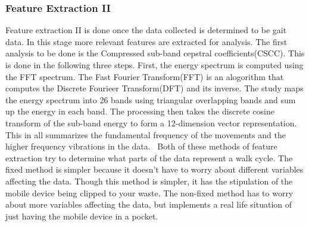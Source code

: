 \documentclass{sig-alternate}
\begin{document}
\subsubsection{Feature Extraction II}{
	Feature extraction II is done once the data collected is determined to be gait data. In this stage more relevant features are extracted for analysis. The first analysis to be done is the Compressed sub-band cepstral coefficients(CSCC). This is done in the following three steps. First, the energy spectrum is computed using the FFT spectrum. The Fast Fourier Transform(FFT) is an alogorithm that computes the Discrete Fourieer Transform(DFT) and its inverse. The study maps the energy spectrum into 26 bands using triangular overlapping bands and sum up the energy in each band. The processing then takes the discrete cosine transform of the sub-band energy to form a 12-dimension vector representation. This in all summarizes the fundamental frequency of the movements and the higher frequency vibrations in the data.~\cite{Sujithra:2012}
}
	Both of these methods of feature extraction try to determine what parts of the data represent a walk cycle. The fixed method is simpler because it doesn't have to worry about different variables affecting the data. Though this method is simpler, it has the stipulation of the mobile device being clipped to your waste. The non-fixed method has to worry about more variables affecting the data, but implements a real life situation of just having the mobile device in a pocket.
	
	
	
		
\end{document}
